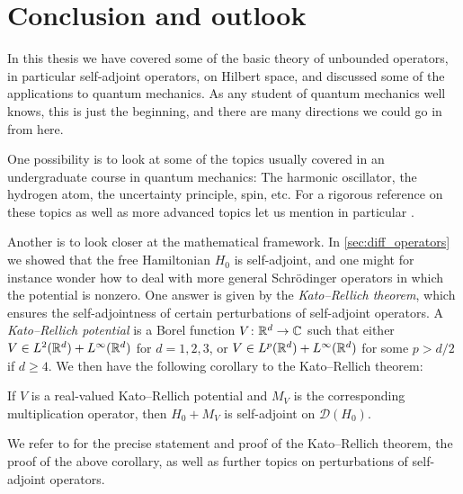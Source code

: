 \documentclass[article, a4paper, 11pt, oneside]{memoir}
\numberwithin{equation}{chapter}
\newcommand{\dom}{\mathcal{D}}
\theoremstyle{myexample}
\theoremstyle{myexample}
\theoremstyle{myexamplebreak}
\theoremstyle{myexamplebreak}
\theoremstyle{nonumberplain}
\theoremstyle{MyNonumberplain}
\begin{document}
\chapter{Conclusion and outlook}

In this thesis we have covered some of the basic theory of unbounded operators, in particular self-adjoint operators, on Hilbert space, and discussed some of the applications to quantum mechanics. As any student of quantum mechanics well knows, this is just the beginning, and there are many directions we could go in from here.

One possibility is to look at some of the topics usually covered in an undergraduate course in quantum mechanics: The harmonic oscillator, the hydrogen atom, the uncertainty principle, spin, etc. For a rigorous reference on these topics as well as more advanced topics let us mention in particular \textcite{hall2013}.

Another is to look closer at the mathematical framework. In \cref{sec:diff_operators} we showed that the free Hamiltonian $H_0$ is self-adjoint, and one might for instance wonder how to deal with more general Schrödinger operators in which the potential is nonzero. One answer is given by the \emph{Kato--Rellich theorem}, which ensures the self-adjointness of certain  perturbations of self-adjoint operators. A \emph{Kato--Rellich potential} is a Borel function $V \colon \mathbb{R}^d \to \mathbb{C}$ such that either $V \in L^2(\mathbb{R}^d) + L^\infty(\mathbb{R}^d)$ for $d = 1,2,3$, or $V \in L^p(\mathbb{R}^d) + L^\infty(\mathbb{R}^d)$ for some $p > d/2$ if $d \geq 4$. We then have the following corollary to the Kato--Rellich theorem:
%
\begin{corollary}
    If $V$ is a real-valued Kato--Rellich potential and $M_V$ is the corresponding multiplication operator, then $H_0 + M_V$ is self-adjoint on $\dom(H_0)$.
\end{corollary}
%
We refer to \textcite[Chapter~8]{schmudgen2012} for the precise statement and proof of the Kato--Rellich theorem, the proof of the above corollary, as well as further topics on perturbations of self-adjoint operators.




\newpage
\appendix


\end{document}
